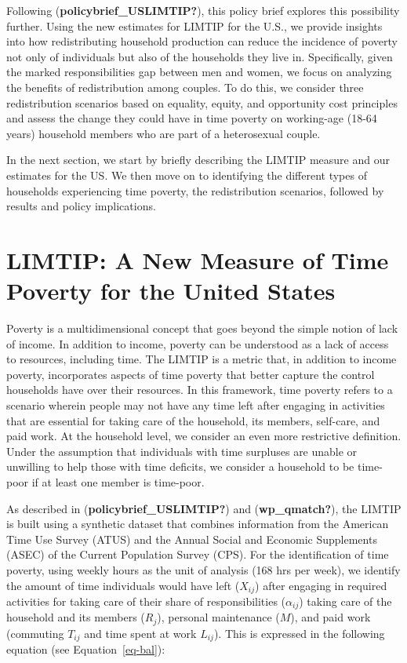 \documentclass[
  11pt,
]{article}
\begin{document}
Following (\textbf{policybrief\_USLIMTIP?}), this policy brief explores
this possibility further. Using the new estimates for LIMTIP for the
U.S., we provide insights into how redistributing household production
can reduce the incidence of poverty not only of individuals but also of
the households they live in. Specifically, given the marked
responsibilities gap between men and women, we focus on analyzing the
benefits of redistribution among couples. To do this, we consider three
redistribution scenarios based on equality, equity, and opportunity cost
principles and assess the change they could have in time poverty on
working-age (18-64 years) household members who are part of a
heterosexual couple.

In the next section, we start by briefly describing the LIMTIP measure
and our estimates for the US. We then move on to identifying the
different types of households experiencing time poverty, the
redistribution scenarios, followed by results and policy implications.

\section{LIMTIP: A New Measure of Time Poverty for the United
States}\label{limtip-a-new-measure-of-time-poverty-for-the-united-states}

Poverty is a multidimensional concept that goes beyond the simple notion
of lack of income. In addition to income, poverty can be understood as a
lack of access to resources, including time. The LIMTIP is a metric
that, in addition to income poverty, incorporates aspects of time
poverty that better capture the control households have over their
resources. In this framework, time poverty refers to a scenario wherein
people may not have any time left after engaging in activities that are
essential for taking care of the household, its members, self-care, and
paid work. At the household level, we consider an even more restrictive
definition. Under the assumption that individuals with time surpluses
are unable or unwilling to help those with time deficits, we consider a
household to be time-poor if at least one member is time-poor.

As described in (\textbf{policybrief\_USLIMTIP?}) and
(\textbf{wp\_qmatch?}), the LIMTIP is built using a synthetic dataset
that combines information from the American Time Use Survey (ATUS) and
the Annual Social and Economic Supplements (ASEC) of the Current
Population Survey (CPS). For the identification of time poverty, using
weekly hours as the unit of analysis (168 hrs per week), we identify the
amount of time individuals would have left (\(X_{ij}\)) after engaging
in required activities for taking care of their share of
responsibilities (\(\alpha_{ij}\)) taking care of the household and its
members (\(R_j\)), personal maintenance (\(M\)), and paid work
(commuting \(T_{ij}\) and time spent at work \(L_{ij}\)). This is
expressed in the following equation (see Equation~\ref{eq-bal}):
\end{document}
